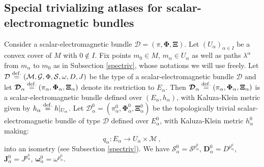 \documentclass[10pt, cmp, numbook, final, a4paper]{svjour}
\newcommand{\eqdef}{\stackrel{{\rm def.}}{=}}
\def\bD{\mathbb{D}}
\def\bcD{\boldsymbol{\mathcal{D}}}
\def\bJ{\mathbf{J}}
\def\bomega{\boldsymbol{\omega}}
\def\bJ{\mathbf{J}}
\newcommand{\cM}{\mathcal{M}}
\def\cD{\mathcal{D}}
\def\cG{\mathcal{G}}
\def\bXi{{\boldsymbol{\Xi}}}
\def\cS{\mathcal{S}}
\def\bPhi{\mathbf{\Phi}}
\def\bD{\mathbf{D}}
\def\bomega{\boldsymbol{\omega}}
\def\bcS{\boldsymbol{\mathcal{S}}}
\def\bD{\mathbf{D}}
\begin{document}
\subsection{Special trivializing atlases for scalar-electromagnetic bundles}
\label{spectrivgauge}

Consider a scalar-electromagnetic bundle $\bcD=(\pi, \bPhi,\bXi)$. Let
$(U_\alpha)_{\alpha\in I}$ be a convex cover of $M$ with $0\not \in I$. Fix
points $m_0\in M$, $m_{\alpha}\in U_\alpha$ as well as paths
$\lambda^{\alpha}$ from $m_{\alpha}$ to $m_0$ as in Subsection
\ref{spectriv}, whose notations we will use freely. Let $\cD\eqdef
(\cM,\cG,\Phi,\cS,\omega,D,J)$ be the type of a scalar-electromagnetic
bundle $\bcD$ and let $\bcD_\alpha \eqdef (\pi_\alpha,
\bPhi_\alpha,\bXi_{\alpha})$ denote its restriction to
$E_\alpha$. Then $\bcD_\alpha \eqdef (\pi_\alpha,
\bPhi_\alpha,\bXi_{\alpha})$ is a scalar-electromagnetic bundle
defined over $(E_{\alpha},h_{\alpha})$, with Kaluza-Klein metric given
by $h_{\alpha}\eqdef h|_{U_{\alpha}}$. Let $\bcD^0_{\alpha}=
(\pi^{0}_{\alpha}, \bPhi^{0}_{\alpha},\bXi^{0}_{\alpha})$ be the
topologically trivial scalar-electromagnetic bundle of type $\cD$
defined over $E^{0}_\alpha$, with Kaluza-Klein metric $h^{0}_{\alpha}$
making:
\begin{equation*}
q_{\alpha}\colon E_{\alpha}\to U_{\alpha}\times \cM\, ,
\end{equation*}
into an isometry (see Subsection \ref{spectriv}). We have
$\bcS^0_{\alpha}=\cS^{p^0_{\alpha}}$, $\bD^0_{\alpha}=D^{p^0_{\alpha}}$,
$\bJ^0_{\alpha}=J^{p^0_{\alpha}}$, $\bomega^0_{\alpha}=\omega^{p^0_{\alpha}}$.
\end{document}
